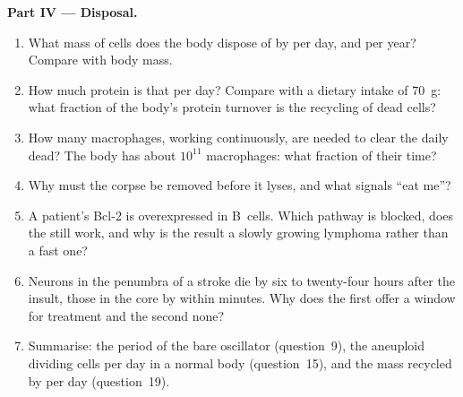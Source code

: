 \begin{problem}
\medskip
\noindent\textbf{Part IV --- Disposal.}
\begin{enumerate}[resume]
  \item What mass of cells does the body dispose of by  per
        day, and per year? Compare with body mass.
  \item How much protein is that per day? Compare with a dietary
        intake of \qty{70}{g}: what fraction of the body's protein
        turnover is the recycling of dead cells?
  \item How many macrophages, working continuously, are needed to
        clear the daily dead? The body has about $10^{11}$
        macrophages: what fraction of their time?
  \item Why must the corpse be removed before it lyses, and what
        signals ``eat me''?
  \item A patient's Bcl-2 is overexpressed in B~cells. Which pathway is
        blocked, does the  still work, and why is the
        result a slowly growing lymphoma rather than a fast one?
  \item Neurons in the penumbra of a stroke die by  six to
        twenty-four hours after the insult, those in the core by
         within minutes. Why does the first offer a window for
        treatment and the second none?
  \item Summarise: the period of the bare oscillator (question~9), the
        aneuploid dividing cells per day in a normal body
        (question~15), and the mass recycled by  per day
        (question~19).
\end{enumerate}
\end{problem}
